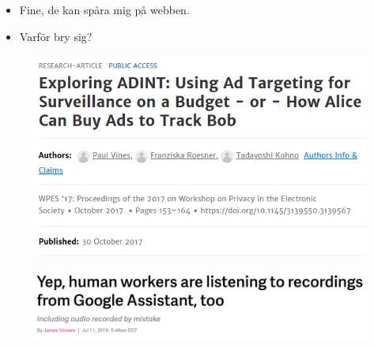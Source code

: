 \begin{frame}
  \begin{question}
    \begin{itemize}
      \item Fine, de kan spåra mig på webben.
      \item Varför bry sig?
    \end{itemize}
  \end{question}
\end{frame}

\begin{frame}
  \begin{figure}
    \includegraphics[width=\columnwidth]{fig/adint.png}
  \end{figure}
\end{frame}

\begin{frame}
  \begin{figure}
    \includegraphics[width=\columnwidth]{fig/listening-assistants.png}
  \end{figure}
\end{frame}

